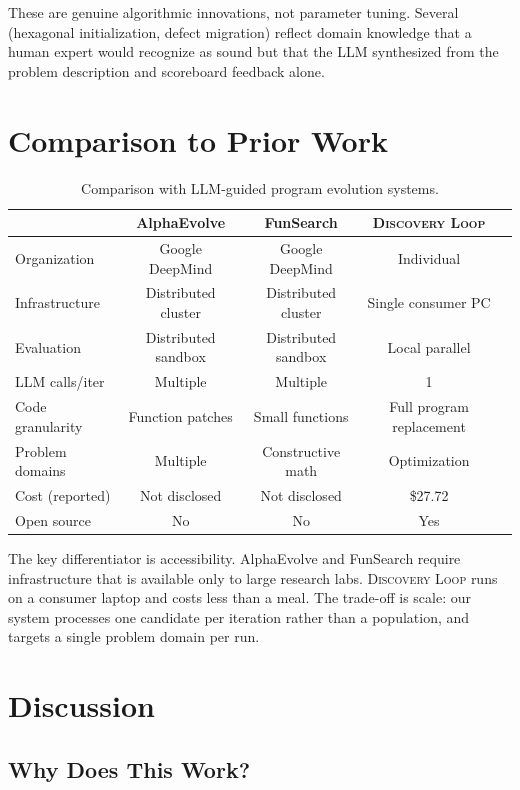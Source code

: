 \documentclass[11pt]{article}
\begin{document}
These are genuine algorithmic innovations, not parameter tuning. Several (hexagonal initialization,
defect migration) reflect domain knowledge that a human expert would recognize as sound but that
the LLM synthesized from the problem description and scoreboard feedback alone.

\section{Comparison to Prior Work}

\begin{table}[h]
\centering
\caption{Comparison with LLM-guided program evolution systems.}
\label{tab:comparison}
\begin{tabular}{@{}lcccc@{}}
\toprule
 & AlphaEvolve & FunSearch & \textsc{Discovery Loop} \\
\midrule
Organization & Google DeepMind & Google DeepMind & Individual \\
Infrastructure & Distributed cluster & Distributed cluster & Single consumer PC \\
Evaluation & Distributed sandbox & Distributed sandbox & Local parallel \\
LLM calls/iter & Multiple & Multiple & 1 \\
Code granularity & Function patches & Small functions & Full program replacement \\
Problem domains & Multiple & Constructive math & Optimization \\
Cost (reported) & Not disclosed & Not disclosed & \$27.72 \\
Open source & No & No & Yes \\
\bottomrule
\end{tabular}
\end{table}

The key differentiator is accessibility. AlphaEvolve and FunSearch require infrastructure
that is available only to large research labs. \textsc{Discovery Loop} runs on a consumer
laptop and costs less than a meal. The trade-off is scale: our system processes one candidate
per iteration rather than a population, and targets a single problem domain per run.

\section{Discussion}

\subsection{Why Does This Work?}
\end{document}
